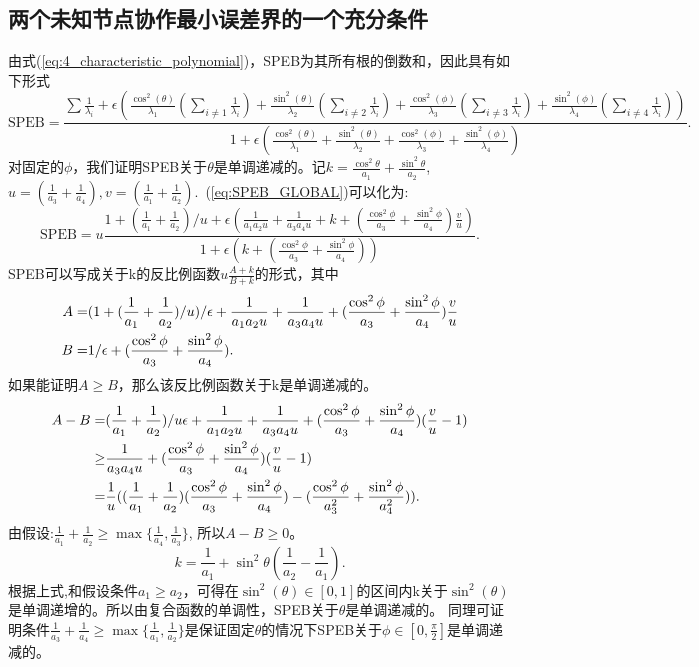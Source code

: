 \subsection{两个未知节点协作最小误差界的一个充分条件}\label{B_F_0}
由式(\ref{eq:4_characteristic_polynomial})，SPEB为其所有根的倒数和，因此具有如下形式
\begin{equation}\label{eq:SPEB_GLOBAL}
\text{SPEB}=\frac{\displaystyle\sum \frac{1}{\lambda_i}+\epsilon(\frac{\cos^2(\theta)}{\lambda_1}(\sum_{i \neq 1}\frac{1}{\lambda_i})+\frac{\sin^2(\theta)}{\lambda_2}(\displaystyle\sum_{i \neq 2}\frac{1}{\lambda_i})+\frac{\cos^2(\phi)}{\lambda_3}(\sum_{i \neq 3}\frac{1}{\lambda_i})+\frac{\sin^2(\phi)}{\lambda_4}(\sum_{i \neq 4}\frac{1}{\lambda_i}))}{\displaystyle 1+\epsilon(\frac{\cos^2(\theta)}{\lambda_1}+\frac{\sin^2(\theta)}{\lambda_2}+\frac{\cos^2(\phi)}{\lambda_3}+\frac{\sin^2(\phi)}{\lambda_4})}.
\end{equation}
对固定的$\phi$，我们证明SPEB关于$\theta$是单调递减的。记$k=\frac{\cos^2 \theta}{a_1}+\frac{\sin^2 \theta}{a_2}$,$u=(\frac{1}{a_3}+\frac{1}{a_4}),v=(\frac{1}{a_1}+\frac{1}{a_2})$.~(\ref{eq:SPEB_GLOBAL})可以化为:
\begin{equation}
\text{SPEB}=u\frac{1+(\frac{1}{a_1}+\frac{1}{a_2})/u+\epsilon(\frac{1}{a_1a_2 u}+\frac{1}{a_3a_4 u}+k+(\frac{\cos^2\phi}{a_3}+\frac{\sin^2\phi}{a_4})\frac{v}{u})}{1+\epsilon(k+(\frac{\cos^2\phi}{a_3}+\frac{\sin^2\phi}{a_4}))}.
\end{equation}
SPEB可以写成关于k的反比例函数$u\frac{A+k}{B+k}$的形式，其中
\begin{align}\notag
A=&(1+(\frac{1}{a_1}+\frac{1}{a_2})/u)/\epsilon+\frac{1}{a_1a_2 u}+\frac{1}{a_3a_4 u}+(\frac{\cos^2\phi}{a_3}+\frac{\sin^2\phi}{a_4})\frac{v}{u}\\
B=&1/\epsilon+(\frac{\cos^2\phi}{a_3}+\frac{\sin^2\phi}{a_4}).
\end{align}
如果能证明$A \geq B$，那么该反比例函数关于k是单调递减的。
\begin{align}\notag
A-B=&(\frac{1}{a_1}+\frac{1}{a_2})/u\epsilon+\frac{1}{a_1a_2 u}+\frac{1}{a_3a_4 u}+(\frac{\cos^2\phi}{a_3}+\frac{\sin^2\phi}{a_4})(\frac{v}{u}-1)\\
\geq &\frac{1}{a_3a_4 u}+(\frac{\cos^2\phi}{a_3}+\frac{\sin^2\phi}{a_4})(\frac{v}{u}-1)\\
=&\frac{1}{u}((\frac{1}{a_1}+\frac{1}{a_2})(\frac{\cos^2\phi}{a_3}+\frac{\sin^2\phi}{a_4})-(\frac{\cos^2\phi}{a_3^2}+\frac{\sin^2\phi}{a_4^2})).\notag
\end{align}
由假设:$\frac{1}{a_1}+\frac{1}{a_2}\geq \max\{\frac{1}{a_4},\frac{1}{a_3}\}$,
所以$A-B\geq 0$。
\begin{equation}
k=\frac{1}{a_1}+\sin^2 \theta(\frac{1}{a_2}-\frac{1}{a_1}).
\end{equation}
根据上式,和假设条件$a_1\geq a_2$，可得在$\sin^2(\theta)\in[0,1]$的区间内k关于$\sin^2(\theta)$是单调递增的。所以由复合函数的单调性，SPEB关于$\theta$是单调递减的。
同理可证明条件$\frac{1}{a_3}+\frac{1}{a_4}\geq \max\{\frac{1}{a_1},\frac{1}{a_2}\}$是保证固定$\theta$的情况下SPEB关于$\phi \in [0,\frac{\pi}{2}]$是单调递减的。
